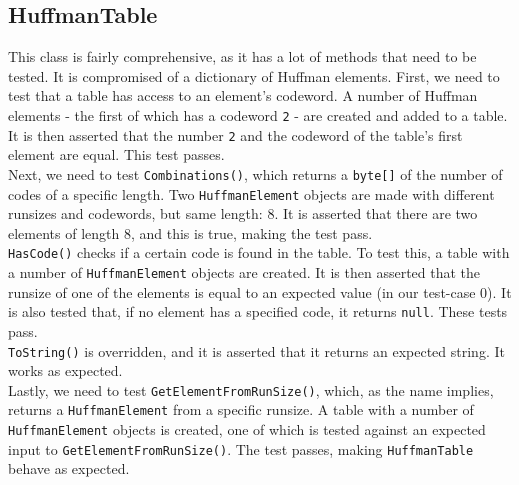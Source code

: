 \subsection*{HuffmanTable}
This class is fairly comprehensive, as it has a lot of methods that need to be tested.
It is compromised of a dictionary of Huffman elements.
First, we need to test that a table has access to an element's codeword.
A number of Huffman elements - the first of which has a codeword \lstinline|2| - are created and added to a table.
It is then asserted that the number \lstinline|2| and the codeword of the table's first element are equal.
This test passes.\\
Next, we need to test \lstinline|Combinations()|, which returns a \lstinline|byte[]| of the number of codes of a specific length.
Two \lstinline|HuffmanElement| objects are made with different runsizes and codewords, but same length: 8.
It is asserted that there are two elements of length 8, and this is true, making the test pass.\\
\lstinline|HasCode()| checks if a certain code is found in the table.
To test this, a table with a number of \lstinline|HuffmanElement| objects are created.
It is then asserted that the runsize of one of the elements is equal to an expected value (in our test-case 0).
It is also tested that, if no element has a specified code, it returns \lstinline|null|.
These tests pass.\\
\lstinline|ToString()| is overridden, and it is asserted that it returns an expected string.
It works as expected.\\
Lastly, we need to test \lstinline|GetElementFromRunSize()|, which, as the name implies, returns a \lstinline|HuffmanElement| from a specific runsize.
A table with a number of \lstinline|HuffmanElement| objects is created, one of which is tested against an expected input to \lstinline|GetElementFromRunSize()|.
The test passes, making \lstinline|HuffmanTable| behave as expected.

